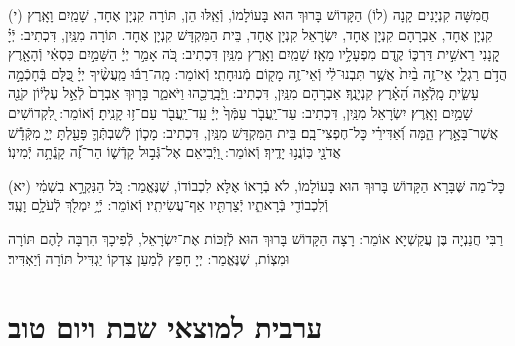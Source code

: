 \documentclass[twoside, openany, parskip=half, 11pt]{book}
\begin{document}
\vspace{0.5\baselineskip}

(י)
חֲמִשָּׁה קִנְיָנִים קָנָה (לוֹ) הַקָּדוֹשׁ בָּרוּךְ הוּא בָּעוֹלָמוֹ, וְֿאֵֽלּוּ הֵן, תּוֹרָה קִנְיָן אֶחָד, שָׁמַֽיִם וָאָֽרֶץ קִנְיָן אֶחָד, אַבְרָהָם קִנְיָן אֶחָד, יִשְׂרָאֵל קִנְיָן אֶחָד, בֵּית הַמִּקְדָּשׁ קִנְיָן אֶחָד. תּוֹרָה מִנַּֽיִן, דִּכְתִיב: יְֿיָ֗ קָ֭נָנִי רֵאשִׁ֣ית דַּרְכּ֑וֹ קֶ֖דֶם מִפְעָלָ֣יו מֵאָֽז׃ שָׁמַֽיִם וָאָֽרֶץ מִנַּֽיִן דִּכְתִיב: כֹּ֚ה אָמַ֣ר יְיָ֔ הַשָּׁמַ֣יִם כִּסְאִ֔י וְֿהָאָ֖רֶץ הֲדֹ֣ם רַגְלָ֑י אֵי־זֶ֥ה בַ֨יִת֙ אֲשֶׁ֣ר תִּבְנוּ־לִ֔י וְֿאֵי־זֶ֥ה מָק֖וֹם מְֿנוּחָתִֽי׃ וְֿאוֹמֵר: מָֽה־רַבּ֬וּ מַֽעֲשֶׂ֨יךָ יְיָ֗ כֻּ֭לָּם בְּֿחָכְֿמָ֣ה עָשִׂ֑יתָ מָֽלְֿאָ֥ה הָ֝אָ֗רֶץ קִנְיָנֶֽךָ׃ אַבְרָהָם מִנַּֽיִן, דִּכְתִיב: וַֽיְֿבָֽרֲכֵ֖הוּ וַיֹּאמַ֑ר בָּר֤וּךְ אַבְרָם֙ לְֿאֵ֣ל עֶלְי֔וֹן קֹנֵ֖ה שָׁמַ֥יִם וָאָֽרֶץ׃ יִשְׂרָאֵל מִנַּֽיִן, דִּכְתִיב: עַד־יַֽעֲבֹ֤ר עַמְּֿךָ֙ יְיָ֔ עַֽד־יַֽעֲבֹ֖ר עַם־ז֥וּ קָנִֽיתָ׃ וְֿאוֹמֵר: לִ֭קְדוֹשִׁים אֲשֶׁר־בָּאָ֣רֶץ הֵ֑מָּה וְֿ֝אַדִּירֵ֗י כׇּל־חֶפְצִי־בָֽם׃ בֵּית הַמִּקְדָּשׁ מִנַּֽיִן, דִּכְתִיב: מָכ֧וֹן לְֿשִׁבְתְּֿךָ֛ פָּעַ֖לְתָּ יְיָ֑ מִקְּֿדָ֕שׁ אֲדֹנָ֖י כּֽוֹנֲנ֥וּ יָדֶֽיךָ׃ וְֿאוֹמֵר: וַ֭יְֿבִיאֵם אֶל־גְּֿב֣וּל קָדְֿשׁ֑וֹ הַר־זֶ֝֗ה קָֽנְֿתָ֥ה יְֿמִינֽוֹ׃

(יא)
כׇּל־מַה שֶּׁבָּרָא הַקָּדוֹשׁ בָּרוּךְ הוּא בָּעוֹלָמוֹ, לֹא בְֿרָאוֹ אֶלָּא לִכְבוֹדוֹ, שֶׁנֶּאֱמַר: כֹּ֚ל הַנִּקְרָ֣א בִשְׁמִ֔י וְֿלִכְבוֹדִ֖י בְּֿרָאתִ֑יו יְֿצַרְתִּ֖יו אַף־עֲשִׂיתִֽיו׃ וְֿאוֹמֵר: יְֿיָ֥ יִמְלֹ֖ךְ לְֿעֹלָ֥ם וָעֶֽד׃



רַבִּי חֲנַנְיָה בֶּן עֲקַשְׁיָא אוֹמֵר:
רָצָה הַקָּדוֹשׁ בָּרוּךְ הוּא לְֿזַכּוֹת אֶת־יִשְׂרָאֵל, לְֿפִיכָךְ הִרְבָּה לָהֶם תּוֹרָה וּמִצְוֹת,
שֶׁנֶּאֱמַר: יְיָ חָפֵץ לְֿמַעַן צִדְקוֹ יַגְדִּיל תּוֹרָה וְֿיַאְדִּיר׃


\mournerskaddish




\vfill
{}\quad{}\quad{}





\chapter[ערבית למוצאי שבת ויום טוב]{ ערבית למוצאי שבת ויום טוב }
\end{document}
